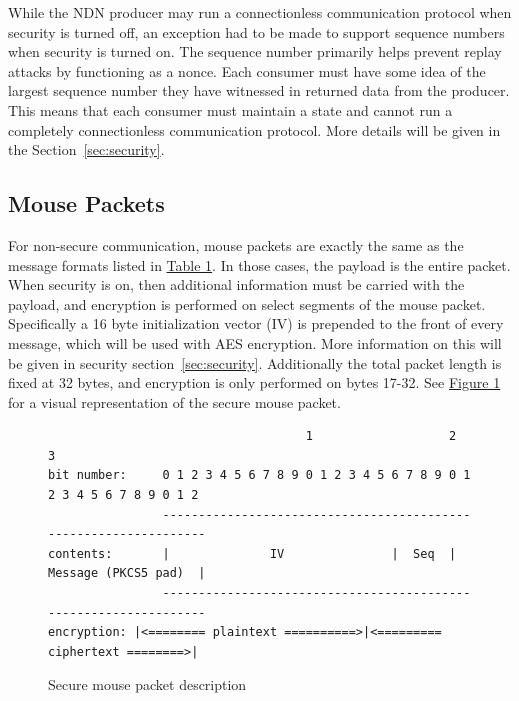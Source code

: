 \documentclass{sig-alternate}
\renewcommand\_{\textunderscore\allowbreak}  %
\begin{document}
While the NDN producer may run a connectionless communication protocol when security is turned off, an exception had to be made to support sequence numbers when security is turned on. The sequence number primarily helps prevent replay attacks by functioning as a nonce. Each consumer must have some idea of the largest sequence number they have witnessed in returned data from the producer. This means that each consumer must maintain a state and cannot run a completely connectionless communication protocol. More details will be given in the Section~\ref{sec:security}.

\subsection{Mouse Packets}
\label{sec:mousepackets}
For non-secure communication, mouse packets are exactly the same as the message formats listed in \hyperlink{tab:msgFormat}{Table 1}. In those cases, the payload is the entire packet. When security is on, then additional information must be carried with the payload, and encryption is performed on select segments of the mouse packet. Specifically a 16 byte initialization vector (IV) is prepended to the front of every message, which will be used with AES encryption. More information on this will be given in security section~\ref{sec:security}. Additionally the total packet length is fixed at 32 bytes, and encryption is only performed on bytes 17-32. See \hyperlink{fig:mousePacketDescription}{Figure 1} for a visual representation of the secure mouse packet.

\begin{figure}
	\hypertarget{fig:mousePacketDescription}{}
\begin{lstlisting}
                                    1                   2                   3
bit number:     0 1 2 3 4 5 6 7 8 9 0 1 2 3 4 5 6 7 8 9 0 1 2 3 4 5 6 7 8 9 0 1 2
                -----------------------------------------------------------------
contents:       |              IV               |  Seq  |  Message (PKCS5 pad)  |
                -----------------------------------------------------------------
encryption:	|<======== plaintext ==========>|<========= ciphertext ========>|
\end{lstlisting}
\caption{Secure mouse packet description}
\end{figure}

\end{document}
